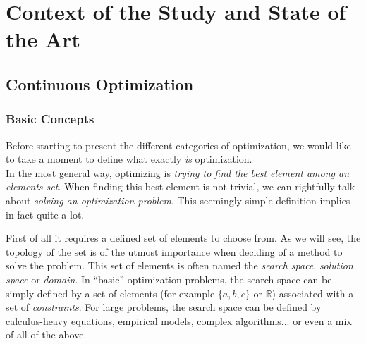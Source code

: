 \part{Context of the Study and State of the Art}


\chapter{Continuous Optimization}

\section{Basic Concepts}

Before starting to present the different categories of optimization, we would like to take a moment to define what exactly \emph{is} optimization.\\
In the most general way, optimizing is \emph{trying to find the best element among an elements set}. When finding this best element is not trivial, we can rightfully talk about \emph{solving an optimization problem}. This seemingly simple definition implies in fact quite a lot.

First of all it requires a defined set of elements to choose from. As we will see, the topology of the set is of the utmost importance when deciding of a method to solve the problem. This set of elements is often named the \emph{search space}, \emph{solution space} or \emph{domain}. In \enquote{basic} optimization problems, the search space can be simply defined by a set of elements (for example $\{a,b,c\}$ or $\mathbb{R}$) associated with a set of \emph{constraints}. For large problems, the search space can be defined by calculus-heavy equations, empirical models, complex algorithms... or even a mix of all of the above.


